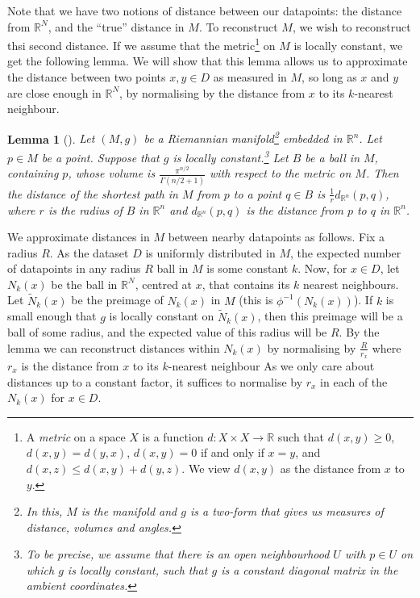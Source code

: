 \documentclass[a4paper,12pt,leqno]{article} \usepackage{amsmath}
\newcommand{\RR}{\mathbb{R}} \newcommand{\QQ}{\mathbb{Q}}
\newtheorem*{lemma}{Lemma}
\theoremstyle{definition}
\begin{document}
Note that we have two notions of distance between our datapoints: the distance
from $\RR^N$, and the ``true'' distance in $M$.
To reconstruct $M$, we wish to reconstruct thsi second distance.
If we assume that the metric\footnote{
  A \textit{metric} on a space $X$ is a function $d: X\times X\to \RR$ such that
  $d(x, y) \geq 0$, $d(x, y) = d(y, x)$, $d(x, y) = 0$ if and only if $x = y$,
  and $d(x, z) \leq d(x, y) + d(y, z)$.
  We view $d(x, y)$ as the distance from $x$ to $y$.
}
on $M$ is locally constant, we get the following lemma.
We will show that this lemma allows us to approximate the distance between two
points $x, y\in D$ as measured in $M$, so long as $x$ and $y$ are close enough
in $\RR^N$, by normalising by the distance from $x$ to its $k$-nearest
neighbour.

\begin{lemma}[\cite{McInnes18}]
  Let $(M, g)$ be a Riemannian manifold\footnote{
    In this, $M$ is the manifold and $g$ is a two-form that gives us measures of
    distance, volumes and angles.
  } embedded in $\RR^n$.
  Let $p\in M$ be a point.
  Suppose that $g$ is locally constant.\footnote{
    To be precise, we assume that there is an open neighbourhood $U$ with
    $p\in U$ on which $g$ is locally constant, such that $g$ is a constant
    diagonal matrix in the ambient coordinates.
  }
  Let $B$ be a ball in $M$, containing $p$, whose volume is
  $\frac{\pi^{n/2}}{\Gamma(n/2+1)}$ with respect to the metric on $M$.
  Then the distance of the shortest path in $M$ from $p$ to a point $q\in B$ is
  $\frac{1}{r}d_{\RR^n}(p, q)$, where $r$ is the radius of $B$ in $\RR^n$ and
  $d_{\RR^n}(p, q)$ is the distance from $p$ to $q$ in $\RR^n$.
\end{lemma}

We approximate distances in $M$ between nearby datapoints as follows.
Fix a radius $R$.
As the dataset $D$ is uniformly distributed in $M$, the expected number of
datapoints in any radius $R$ ball in $M$ is some constant $k$.
Now, for $x\in D$, let $N_k(x)$ be the ball in $\RR^N$, centred at $x$, that
contains its $k$ nearest neighbours.
Let $\tilde{N}_k(x)$ be the preimage of $N_k(x)$ in $M$ (this is $\phi^{-1}(N_k(x))$).
If $k$ is small enough that $g$ is locally constant on $\tilde{N}_k(x)$, then
this preimage will be a ball of some radius, and the expected value of this
radius will be $R$.
By the lemma we can reconstruct
distances within $N_k(x)$ by normalising by $\frac{R}{r_x}$ where $r_x$ is the
distance from $x$ to its $k$-nearest neighbour
As we only care about distances up to a constant factor, it suffices to
normalise by $r_x$ in each of the $N_k(x)$ for $x\in D$.
\end{document}
